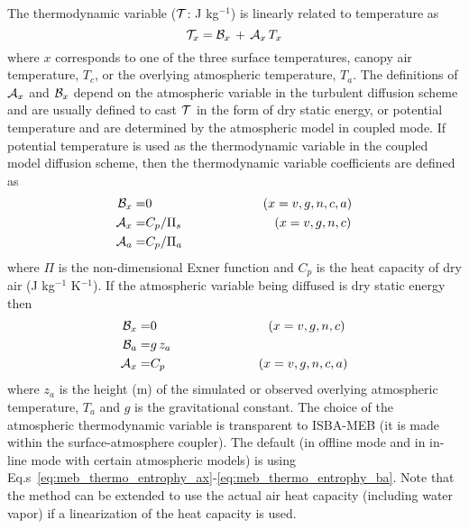 The thermodynamic variable (${\cal T}$: J kg$^{-1}$) is linearly related to temperature as
%
\begin{equation}
\label{eq:meb_thermo_var}
{\cal T}_x = {\cal B}_{x} \,+\, {\cal A}_{x} \, T_x
%
\end{equation}
%
where $x$ corresponds to one of the three surface
temperatures, canopy air temperature, $T_c$, or the overlying
atmospheric temperature, $T_a$.
The definitions of ${\cal A}_{x}$ and ${\cal B}_{x}$ depend on the
atmospheric variable in the turbulent diffusion scheme and are usually
defined to cast ${\cal T}$ in the form of dry static energy,
or potential temperature and are determined by the 
atmospheric model in coupled mode.
%
If potential temperature is used as the thermodynamic
variable in the coupled model diffusion scheme, then the thermodynamic
variable
coefficients are defined as
%
\begin{align}
\label{eq:meb_thermo_entrophy_ax}
{\cal B}_{x} =& 0            \hskip1.2in \left(x=v,g,n,c,a\right) 
\\
\label{eq:meb_thermo_entrophy_bx}
{\cal A}_{x} =& C_p/\Pi_s    \hskip1.0in \left(x=v,g,n,c\right) 
\\
\label{eq:meb_thermo_entrophy_ba}
{\cal A}_{a} =& C_p/\Pi_a    
%
\end{align}
%
where $\Pi$ is the non-dimensional Exner function and $C_p$ is the heat capacity of
dry air (J kg$^{-1}$ K$^{-1}$).
If the atmospheric variable being diffused is dry static
energy then
%
\begin{align}
\label{eq:meb_thermo_drystatice_ax}
{\cal B}_{x} =& 0            \hskip1.2in \left(x=v,g,n,c\right) 
\\
\label{eq:meb_thermo_drystatice_aa}
{\cal B}_{a} =& g\,z_a            
\\
\label{eq:meb_thermo_drystatice_bx}
{\cal A}_{x} =& C_p       \hskip1.0in \left(x=v,g,n,c,a\right) 
%
\end{align}
%
where $z_a$ is the height (m) of the simulated or observed overlying
atmospheric temperature, $T_a$ and $g$ is the gravitational constant.
The choice of the atmospheric thermodynamic variable is 
transparent to ISBA-MEB (it is made within the surface-atmosphere
coupler). The default (in offline mode and in in-line mode with certain
atmospheric models) is using Eq.s~\ref{eq:meb_thermo_entrophy_ax}-\ref{eq:meb_thermo_entrophy_ba}.
Note that the method can be extended to use the actual air heat
capacity (including water vapor) if a linearization of the heat capacity is used.

